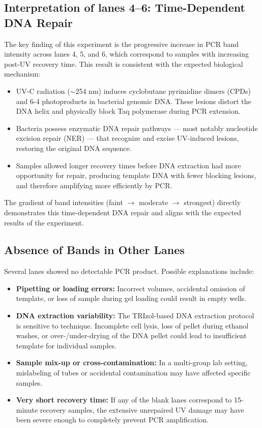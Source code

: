 \documentclass[a4paper]{article}
\begin{document}
\subsection{Interpretation of lanes 4--6: Time-Dependent DNA Repair}
The key finding of this experiment is the progressive increase in PCR band intensity across lanes 4, 5, and 6, which correspond to samples with increasing post-UV recovery time. This result is consistent with the expected biological mechanism:
\begin{itemize}
    \item UV-C radiation ($\sim$254 nm) induces cyclobutane pyrimidine dimers (CPDs) and 6-4 photoproducts in bacterial genomic DNA. These lesions distort the DNA helix and physically block Taq polymerase during PCR extension.
    \item Bacteria possess enzymatic DNA repair pathways --- most notably nucleotide excision repair (NER) --- that recognize and excise UV-induced lesions, restoring the original DNA sequence.
    \item Samples allowed longer recovery times before DNA extraction had more opportunity for repair, producing template DNA with fewer blocking lesions, and therefore amplifying more efficiently by PCR.
\end{itemize}
The gradient of band intensities (faint $\rightarrow$ moderate $\rightarrow$ strongest) directly demonstrates this time-dependent DNA repair and aligns with the expected results of the experiment.

\subsection{Absence of Bands in Other Lanes}
Several lanes showed no detectable PCR product. Possible explanations include:
\begin{itemize}
    \item \textbf{Pipetting or loading errors:} Incorrect volumes, accidental omission of template, or loss of sample during gel loading could result in empty wells.
    \item \textbf{DNA extraction variability:} The TRIzol-based DNA extraction protocol is sensitive to technique. Incomplete cell lysis, loss of pellet during ethanol washes, or over-/under-drying of the DNA pellet could lead to insufficient template for individual samples.
    \item \textbf{Sample mix-up or cross-contamination:} In a multi-group lab setting, mislabeling of tubes or accidental contamination may have affected specific samples.
    \item \textbf{Very short recovery time:} If any of the blank lanes correspond to 15-minute recovery samples, the extensive unrepaired UV damage may have been severe enough to completely prevent PCR amplification.
\end{itemize}
\end{document}
